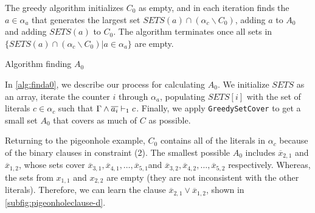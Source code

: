 

The greedy algorithm initializes $C_0$ as empty, and in each iteration finds the $a \in \alpha_a$ that generates the largest set $SETS(a) \cap (\alpha_c \backslash C_0)$, adding $a$ to $A_0$ and adding $SETS(a)$ to $C_0$.
The algorithm terminates once all sets in $\{SETS(a) \cap (\alpha_c \backslash C_0) | a \in \alpha_a \}$ are empty.


\begin{algorithm}
    \caption{Algorithm finding $A_0$}\label{alg:finda0}
    \SetAlgoNoLine
\end{algorithm}

In \autoref{alg:finda0}, we describe our process for calculating $A_0$. 
We initialize $SETS$ as an array, iterate the counter
$i$ through $\alpha_a$, populating $SETS[i]$ with the set of literals
$c \in \alpha_c$ such that $\Gamma \land \overline{a_i} \vdash_1 c$. Finally, we apply
\texttt{GreedySetCover} to get a small set $A_0$ that covers as much of $C$ as possible.

Returning to the pigeonhole example, 
$C_0$ contains all of the literals in $\alpha_c$ because of the binary clauses in constraint (2). 
The smallest possible $A_0$ includes $\overline{x}_{2, 1}$ and $\overline{x}_{1, 2}$, whose 
sets cover $\overline{x}_{3, 1}, \overline{x}_{4, 1},  \ldots, \overline{x}_{5,
1}$and  $\overline{x}_{3, 2}, \overline{x}_{4, 2},  \ldots, \overline{x}_{5,
2}$ respectively. 
Whereas, the sets from $x_{1, 1}$ and $x_{2, 2}$ are empty (they are not inconsistent with the other literals).
Therefore, we can learn the clause $\overline{x}_{2, 1} \lor \overline{x}_{1, 2}$, shown in 
\autoref{subfig:pigeonholeclause-d}.

